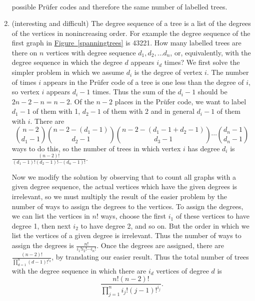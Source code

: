 \documentclass[10pt,]{book}
\theoremstyle{plain}
\theoremstyle{definition}
\numberwithin{equation}{chapter}
\begin{document}
\begin{enumerate}
\begin{align*}
\end{align*}
possible Prüfer codes and therefore the same number of labelled trees.%
%
\item\hypertarget{li-48}{}(interesting and difficult) The degree sequence of a tree is a list of the degrees of the vertices in nonincreasing order.  For example the degree sequence of the first graph in \hyperref[spanningtrees]{Figure~\ref{spanningtrees}} is 43221.  How many labelled trees are there on \(n\) vertices with degree sequence \(d_1,d_2,\ldots d_n\), or, equivalently, with the degree sequence in which the degree \(d\) appears \(i_d\) times? We first solve the simpler problem in which we assume \(d_i\) is the degree of vertex \(i\). The number of times \(i\) appears in the Prüfer code of a tree is one less than the degree of \(i\), so vertex \(i\) appears \(d_i-1\) times. Thus the sum of the \(d_i-1\) should be \(2n-2-n=n-2\). Of the \(n-2\) places in the Prüfer code, we want to label \(d_1-1\) of them with 1, \(d_2-1\) of them with 2 and in general \(d_i-1\) of them with \(i\). There are%
\begin{equation*}
\binom{n-2}{d_1-1}\binom{n-2-(d_1-1)}{d_2-1}\binom{n-2-(d_1-1+d_2-1)}{d_3-1}\cdots\binom{d_n-1}{d_n-1}
\end{equation*}
ways to do this, so the number of trees in which vertex \(i\) has degree \(d_i\) is \(\frac{(n-2)!}{(d_1-1)!(d_2-1)!\cdots(d_n-1)!}\).%
\par
Now we modify the solution by observing that to count all graphs with a given degree sequence, the actual vertices which have the given degrees is irrelevant, so we must multiply the result of the easier problem by the number of ways to assign the degrees to the vertices. To assign the degrees, we can list the vertices in \(n!\) ways, choose the first \(i_1\) of these vertices to have degree 1, then next \(i_2\) to have degree 2, and so on. But the order in which we list the vertices of a given degree is irrelevant. Thus the number of ways to assign the degrees is \(\frac{n!}{i_1!i_2!\cdots i_n!}\). Once the degrees are assigned, there are \(\frac{(n-2)!}{\prod_{d=1}^n (d-1)!^{i_d}}\), by translating our easier result. Thus the total number of trees with the degree sequence in which there are \(i_d\) vertices of degree \(d\) is%
\begin{equation*}
\frac{n!(n-2)!}{\prod_{j=1}^n i_j!(j-1)!^{i_j}}.
\end{equation*}
%
%
\end{enumerate}
\typeout{************************************************}
\typeout{************************************************}
\end{document}
